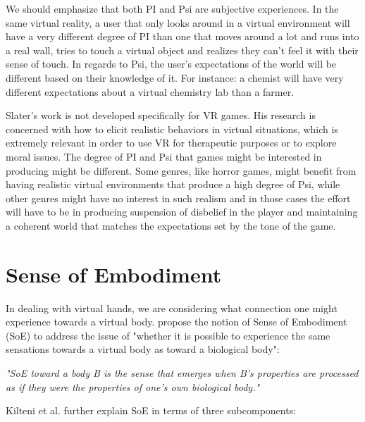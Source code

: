We should emphasize that both PI and Psi are subjective experiences. In the same virtual reality, a user that only looks around in a virtual environment will have a very different degree of PI than one that moves around a lot and runs into a real wall, tries to touch a virtual object and realizes they can't feel it with their sense of touch. In regards to Psi, the user's expectations of the world will be different based on their knowledge of it. For instance: a chemist will have very different expectations about a virtual chemistry lab than a farmer.

Slater's work is not developed specifically for VR games. His research is concerned with how to elicit realistic behaviors in virtual situations, which is extremely relevant in order to use VR for therapeutic purposes or to explore moral issues. The degree of PI and Psi that games might be interested in producing might be different. Some genres, like horror games, might benefit from having realistic virtual environments that produce a high degree of Psi, while other genres might have no interest in such realism and in those cases the effort will have to be in producing suspension of disbelief in the player and maintaining a coherent world that matches the expectations set by the tone of the game.


\section{Sense of Embodiment}
\label{sec:embodiment}

In dealing with virtual hands, we are considering what connection one might experience towards a virtual body. \parencite{Kilteni2012} propose the notion of Sense of Embodiment (SoE) to address the issue of "whether it is possible to experience the same sensations towards a virtual body as toward a biological body":

\begin{displayquote}
\textit{"SoE toward a body B is the sense that emerges when B's properties are processed as if they were the properties of one's own biological body."}
\end{displayquote}

Kilteni et al. further explain SoE in terms of three subcomponents:

